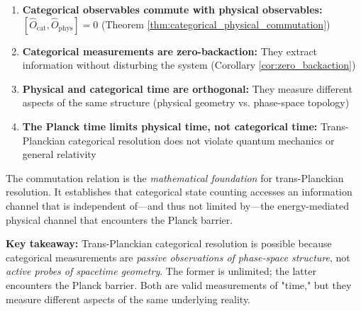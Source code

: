 \documentclass[twocolumn,10pt]{article}
\theoremstyle{remark}
\begin{document}
\begin{enumerate}
    \item \textbf{Categorical observables commute with physical observables:} $[\hat{O}_{\text{cat}}, \hat{O}_{\text{phys}}] = 0$ (Theorem \ref{thm:categorical_physical_commutation})
    
    \item \textbf{Categorical measurements are zero-backaction:} They extract information without disturbing the system (Corollary \ref{cor:zero_backaction})
    
    \item \textbf{Physical and categorical time are orthogonal:} They measure different aspects of the same structure (physical geometry vs. phase-space topology)
    
    \item \textbf{The Planck time limits physical time, not categorical time:} Trans-Planckian categorical resolution does not violate quantum mechanics or general relativity
\end{enumerate}

The commutation relation is the \textit{mathematical foundation} for trans-Planckian resolution. It establishes that categorical state counting accesses an information channel that is independent of—and thus not limited by—the energy-mediated physical channel that encounters the Planck barrier.

\textbf{Key takeaway:} Trans-Planckian categorical resolution is possible because categorical measurements are \textit{passive observations of phase-space structure}, not \textit{active probes of spacetime geometry}. The former is unlimited; the latter encounters the Planck barrier. Both are valid measurements of "time," but they measure different aspects of the same underlying reality.
\end{document}
